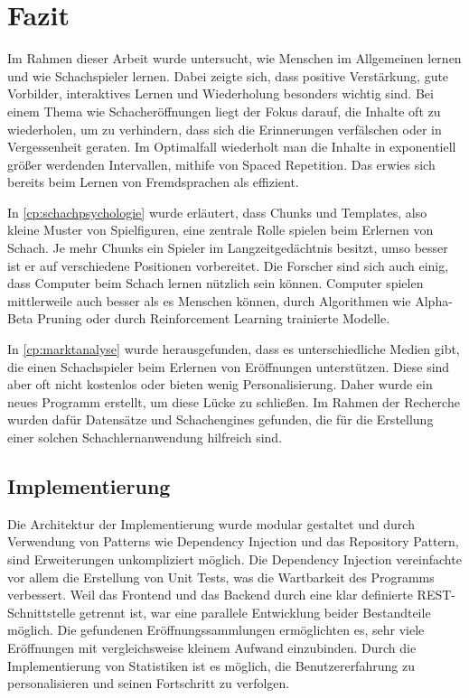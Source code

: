 
\chapter{Fazit}
Im Rahmen dieser Arbeit wurde untersucht, wie Menschen im Allgemeinen lernen und wie Schachspieler lernen. Dabei zeigte sich, dass positive Verstärkung, gute Vorbilder, interaktives Lernen und Wiederholung besonders wichtig sind.
Bei einem Thema wie Schacheröffnungen liegt der Fokus darauf, die Inhalte oft zu wiederholen, um zu verhindern, dass sich die Erinnerungen verfälschen oder in Vergessenheit geraten. Im Optimalfall wiederholt man die Inhalte in exponentiell größer werdenden Intervallen, mithife von Spaced Repetition. Das erwies sich bereits beim Lernen von Fremdsprachen als effizient.

In \autoref{cp:schachpsychologie} wurde erläutert, dass Chunks und Templates, also kleine Muster von Spielfiguren, eine zentrale Rolle spielen beim Erlernen von Schach. Je mehr Chunks ein Spieler im Langzeitgedächtnis besitzt, umso besser ist er auf verschiedene Positionen vorbereitet. Die Forscher sind sich auch einig, dass Computer beim Schach lernen nützlich sein können. Computer spielen mittlerweile auch besser als es Menschen können, durch Algorithmen wie Alpha-Beta Pruning oder durch Reinforcement Learning trainierte Modelle.

In \autoref{cp:marktanalyse} wurde herausgefunden, dass es unterschiedliche Medien gibt, die einen Schachspieler beim Erlernen von Eröffnungen unterstützen. Diese sind aber oft nicht kostenlos oder bieten wenig Personalisierung. Daher wurde ein neues Programm erstellt, um diese Lücke zu schließen. Im Rahmen der Recherche wurden dafür Datensätze und Schachengines gefunden, die für die Erstellung einer solchen Schachlernanwendung hilfreich sind.

\section{Implementierung}
Die Architektur der Implementierung wurde modular gestaltet und durch Verwendung von Patterns wie Dependency Injection und das Repository Pattern, sind Erweiterungen unkompliziert möglich. Die Dependency Injection vereinfachte vor allem die Erstellung von Unit Tests, was die Wartbarkeit des Programms verbessert. Weil das Frontend und das Backend durch eine klar definierte REST-Schnittstelle getrennt ist, war eine parallele Entwicklung beider Bestandteile möglich. Die gefundenen Eröffnungssammlungen ermöglichten es, sehr viele Eröffnungen mit vergleichsweise kleinem Aufwand einzubinden. Durch die Implementierung von Statistiken ist es möglich, die Benutzererfahrung zu personalisieren und seinen Fortschritt zu verfolgen.

